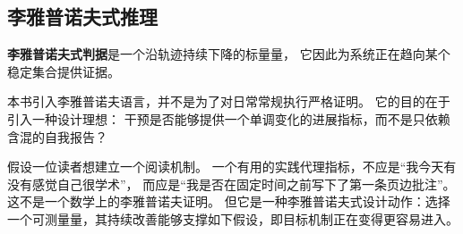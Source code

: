 \subsection{李雅普诺夫式推理}

\begin{definition}[李雅普诺夫式判据]
\textbf{李雅普诺夫式判据}是一个沿轨迹持续下降的标量量，
它因此为系统正在趋向某个稳定集合提供证据。
\end{definition}

本书引入李雅普诺夫语言，并不是为了对日常常规执行严格证明。
它的目的在于引入一种设计理想：
干预是否能够提供一个单调变化的进展指标，而不是只依赖含混的自我报告？

\begin{example}[单调进展代理指标]
假设一位读者想建立一个阅读机制。
一个有用的实践代理指标，不应是“我今天有没有感觉自己很学术”，
而应是“我是否在固定时间之前写下了第一条页边批注”。
这不是一个数学上的李雅普诺夫证明。
但它是一种李雅普诺夫式设计动作：选择一个可测量量，其持续改善能够支撑如下假设，即目标机制正在变得更容易进入。
\end{example}